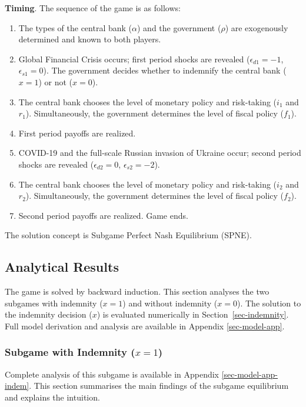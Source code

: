 \documentclass[
  a4paper,
  abstract=true]{scrartcl}
\theoremstyle{definition}
\begin{document}
\textbf{Timing}. The sequence of the game is as follows:

\begin{enumerate}
\def\labelenumi{\arabic{enumi}.}
\item
  The types of the central bank (\(\alpha\)) and the government
  (\(\rho\)) are exogenously determined and known to both players.
\item
  Global Financial Crisis occurs; first period shocks are revealed
  (\(\epsilon_{d1}=-1\), \(\epsilon_{s1}=0\)). The government decides
  whether to indemnify the central bank (\(x=1\)) or not (\(x=0\)).
\item
  The central bank chooses the level of monetary policy and risk-taking
  (\(i_1\) and \(r_1\)). Simultaneously, the government determines the
  level of fiscal policy (\(f_1\)).
\item
  First period payoffs are realized.
\item
  COVID-19 and the full-scale Russian invasion of Ukraine occur; second
  period shocks are revealed (\(\epsilon_{d2}=0\),
  \(\epsilon_{s2}=-2\)).
\item
  The central bank chooses the level of monetary policy and risk-taking
  (\(i_2\) and \(r_2\)). Simultaneously, the government determines the
  level of fiscal policy (\(f_2\)).
\item
  Second period payoffs are realized. Game ends.
\end{enumerate}

The solution concept is Subgame Perfect Nash Equilibrium (SPNE).

\subsection{Analytical Results}\label{sec-analytical-main}

The game is solved by backward induction. This section analyses the two
subgames with indemnity (\(x=1\)) and without indemnity (\(x=0\)). The
solution to the indemnity decision (\(x\)) is evaluated numerically in
Section~\ref{sec-indemnity}. Full model derivation and analysis are
available in Appendix \ref{sec-model-app}.

\subsubsection{\texorpdfstring{Subgame with Indemnity
(\(x=1\))}{Subgame with Indemnity (x=1)}}\label{subgame-with-indemnity-x1}

Complete analysis of this subgame is available in Appendix
\ref{sec-model-app-indem}. This section summarises the main findings of
the subgame equilibrium and explains the intuition.
\end{document}
